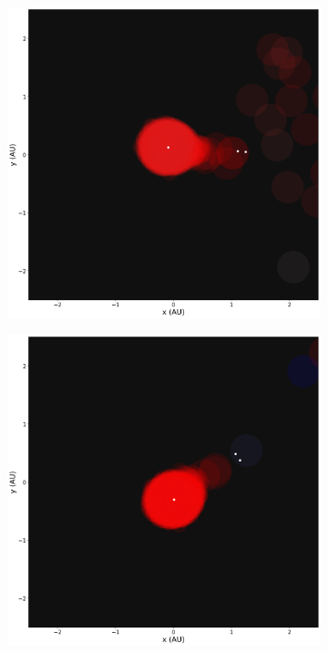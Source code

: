 \begin{figure}[H]
\begin{subfigure}[b]{0.47\textwidth}
    \end{subfigure}
    \hfill
    \begin{subfigure}[b]{0.47\textwidth}  
        \centering 
        \includegraphics[width=\textwidth]{Thesis/graphs/snapshot_0023490.png}
    \end{subfigure}
    \hfill
    \begin{subfigure}[b]{0.47\textwidth}  
        \centering 
        \includegraphics[width=\textwidth]{Thesis/graphs/snapshot_0023660.png}

\end{subfigure}
\end{figure}
